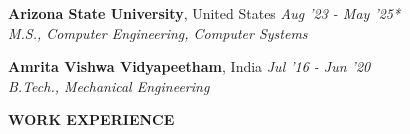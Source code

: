 \documentclass[11pt,a3]{article}
\def\hrulefill{\leavevmode\leaders\hrule height 1pt\hfill\kern 0pt}		%
\begin{document}
{\begin{flushleft}
		\vspace{1.5mm}

	\textbf{\large Arizona State University}, \large United States \tab  \hfill \textit{\large Aug '23 - May '25*}	\\
        \hspace{0.5cm} \textit{\large M.S., Computer Engineering, Computer Systems}	\\
		


    \vspace{1mm}

    
    \textbf{\large Amrita Vishwa Vidyapeetham}, \large India \tab  \hfill \textit{\large Jul '16 - Jun '20}	\\
        \hspace{0.5 cm}\textit{\large B.Tech., Mechanical Engineering}

		
	\end{flushleft}
		
		
		
\begin{flushleft}
		{\Large \textbf{WORK EXPERIENCE}} %
  

\end{flushleft}}
\end{document}
